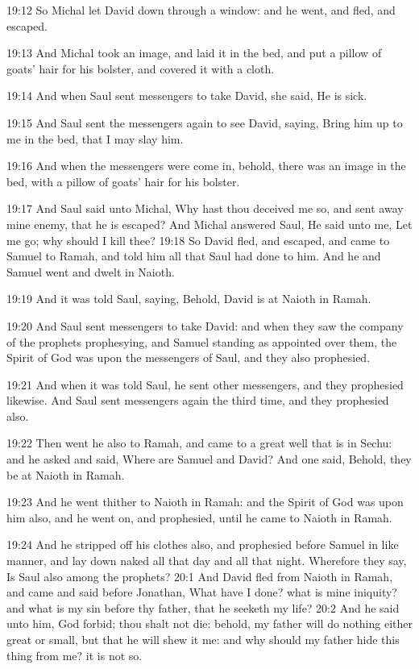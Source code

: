 19:12 So Michal let David down through a window: and he went, and fled, and escaped.

19:13 And Michal took an image, and laid it in the bed, and put a pillow of goats' hair for his bolster, and covered it with a cloth.

19:14 And when Saul sent messengers to take David, she said, He is sick.

19:15 And Saul sent the messengers again to see David, saying, Bring him up to me in the bed, that I may slay him.

19:16 And when the messengers were come in, behold, there was an image in the bed, with a pillow of goats' hair for his bolster.

19:17 And Saul said unto Michal, Why hast thou deceived me so, and sent away mine enemy, that he is escaped? And Michal answered Saul, He said unto me, Let me go; why should I kill thee?  19:18 So David fled, and escaped, and came to Samuel to Ramah, and told him all that Saul had done to him. And he and Samuel went and dwelt in Naioth.

19:19 And it was told Saul, saying, Behold, David is at Naioth in Ramah.

19:20 And Saul sent messengers to take David: and when they saw the company of the prophets prophesying, and Samuel standing as appointed over them, the Spirit of God was upon the messengers of Saul, and they also prophesied.

19:21 And when it was told Saul, he sent other messengers, and they prophesied likewise. And Saul sent messengers again the third time, and they prophesied also.

19:22 Then went he also to Ramah, and came to a great well that is in Sechu: and he asked and said, Where are Samuel and David? And one said, Behold, they be at Naioth in Ramah.

19:23 And he went thither to Naioth in Ramah: and the Spirit of God was upon him also, and he went on, and prophesied, until he came to Naioth in Ramah.

19:24 And he stripped off his clothes also, and prophesied before Samuel in like manner, and lay down naked all that day and all that night. Wherefore they say, Is Saul also among the prophets?  20:1 And David fled from Naioth in Ramah, and came and said before Jonathan, What have I done? what is mine iniquity? and what is my sin before thy father, that he seeketh my life?  20:2 And he said unto him, God forbid; thou shalt not die: behold, my father will do nothing either great or small, but that he will shew it me: and why should my father hide this thing from me? it is not so.

